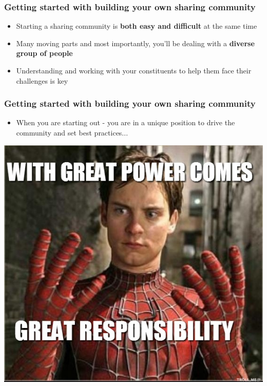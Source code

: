 \begin{frame}
\frametitle{Getting started with building your own sharing community}
\begin{itemize}
	\item Starting a sharing community is {\bf both easy and difficult} at the same time
    \item Many moving parts and most importantly, you'll be dealing with a {\bf diverse group of people}
	\item Understanding and working with your constituents to help them face their challenges is key
\end{itemize}
\end{frame}

\begin{frame}
\frametitle{Getting started with building your own sharing community}
\begin{itemize}
	\item When you are starting out - you are in a unique position to drive the community and set best practices...
\end{itemize}
\includegraphics[scale=0.3]{screenshots/power-responsibility.png}
\end{frame}

